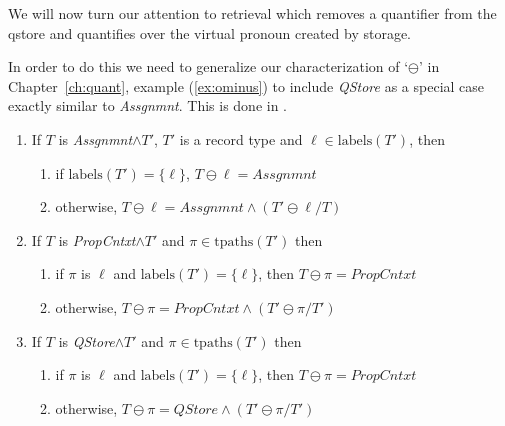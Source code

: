 We will now turn our attention to retrieval which removes a quantifier
from the qstore and quantifies over the virtual pronoun created by
storage.


\begin{shaded}
In order to do this we need to generalize our
characterization of `$\ominus$' in Chapter~\ref{ch:quant}, example (\ref{ex:ominus}) to include
\textit{QStore} as a special case exactly similar to
\textit{Assgnmnt}.  This is done in \nexteg{}.
\begin{ex}

  \begin{enumerate} 

  
 
\item If $T$ is \textit{Assgnmnt}$\wedge T'$, $T'$ is a record type and
  $\ell\in\mathrm{labels}(T')$, then
  \begin{enumerate} 
    
  \item if $\mathrm{labels}(T')=\{\ell\}$, $T\ominus\ell=\textit{Assgnmnt}$ 
    
  \item otherwise, $T\ominus\ell= \textit{Assgnmnt}\wedge (T'\ominus\ell/T)$
    
  \end{enumerate}
  
\item If $T$ is \textit{PropCntxt}$\wedge T'$ and
  $\pi\in\mathrm{tpaths}(T')$ then
  \begin{enumerate}
    
  \item if $\pi$ is $\ell$ and $\mathrm{labels}(T')=\{\ell\}$, then $T\ominus\pi=\textit{PropCntxt}$
    
  \item otherwise, $T\ominus\pi= \textit{PropCntxt}\wedge(T'\ominus \pi/T')$
  \end{enumerate}

  
\item If $T$ is \textit{QStore}$\wedge T'$ and
  $\pi\in\mathrm{tpaths}(T')$ then
  \begin{enumerate}
    
  \item if $\pi$ is $\ell$ and $\mathrm{labels}(T')=\{\ell\}$, then $T\ominus\pi=\textit{PropCntxt}$
    
  \item otherwise, $T\ominus\pi= \textit{QStore}\wedge(T'\ominus \pi/T')$
  \end{enumerate}
\end{enumerate}

\label{ex:ominus-with-qstore}   
\end{ex}

\end{shaded}

